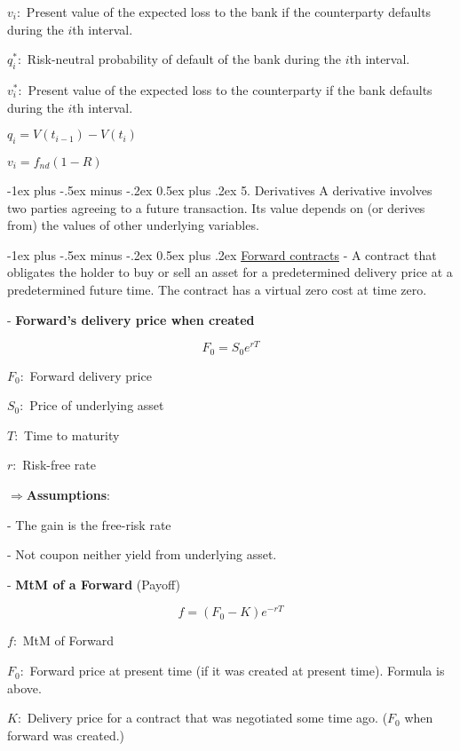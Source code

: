 \documentclass[10pt,landscape]{article}
\makeatletter
\renewcommand{\section}{\@startsection{section}{1}{0mm}%
                                {-1ex plus -.5ex minus -.2ex}%
                                {0.5ex plus .2ex}%
                                {\normalfont\large\bfseries}}
\renewcommand{\subsection}{\@startsection{subsection}{2}{0mm}%
                                {-1ex plus -.5ex minus -.2ex}%
                                {0.5ex plus .2ex}%
                                {\normalfont\normalsize\bfseries}}
\makeatother
\begin{document}
\begin{multicols}{3}
    $v_i:$ Present value of the expected loss to the bank if the counterparty defaults during the $i$th interval.
    
    $q_i^*:$ Risk-neutral probability of default of the bank during the $i$th interval.
    
    $v_i^*:$ Present value of the expected loss to the counterparty if the bank defaults during the $i$th interval.
    
    $q_i = V(t_{i-1}) - V(t_{i})$
    
    $v_i = f_{nd}(1-R)$

    \section{5. Derivatives}
    A derivative involves two parties agreeing to a future transaction. Its value depends
on (or derives from) the values of other underlying variables.
    
    \subsection{\underline{Forward contracts}}
    - A contract that obligates the holder to buy or sell an asset for a predetermined delivery price at a predetermined future time.
    The contract has a virtual zero cost at time zero.
    
    - \textbf{Forward's delivery price when created}

    $$F_0 = S_0e^{rT}$$

    $F_0:$ Forward delivery price
    
    $S_0:$ Price of underlying asset 
    
    $T:$ Time to maturity 
    
    $r:$ Risk-free rate 

    $\Rightarrow $\textbf{Assumptions}: 

    - The gain is the free-risk rate

    - Not coupon neither yield from underlying asset.  

    \vspace{2mm}
    - \textbf{MtM of a Forward} (Payoff)

    $$f = (F_0-K)e^{-rT}$$
    
    $f:$ MtM of Forward

    $F_0:$ Forward price at present time (if it was created at present time). Formula is above.
    
    $K:$ Delivery price for a contract that was negotiated some time ago. ($F_0$ when forward was created.)


\end{multicols}
\end{document}
